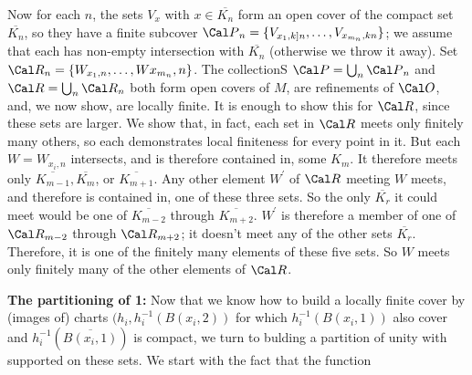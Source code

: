 Now for each $n$, the sets $V_x$ with $x\in \overline{K_n}$ form an open cover of the compact set $\overline{K_n}$,
so they have a finite subcover ${\Cal P}_n=\{V_{x_1,k]n},\ldots ,V_{x_{m_n},kn}\}$; we assume that each
has non-empty intersection with $\overline{K_n}$ (otherwise we throw it away). 
Set ${\Cal R}_n=\{W_{x_1,n},\ldots ,W{x_{m_n},n}\}$. The collectionS
$\Cal P=\bigcup_n{\Cal P}_n$  and ${\Cal R}=\bigcup_n{\Cal R}_n$ both form open covers of $M$, are
refinements of $\Cal O$, and, we now show, are locally finite. It is enough to show this for $\Cal R$,
since these sets are larger. We show that, in fact, each set in $\Cal R$ meets only
finitely many others, so each demonstrates local finiteness for every point in it.
But each $W=W_{x_i,n}$ intersects, and is therefore contained in, some $K_m$. 
It therefore meets only $\overline{K_{m-1}}, \overline{K_m}$, or $\overline{K_{m+1}}$. 
Any other element $W^\prime$ of $\Cal R$ meeting $W$ meets, and therefore is contained in, one of these three
sets. So the only $\overline{K_r}$ it could meet would be one of $\overline{K_{m-2}}$
through $\overline{K_{m+2}}$. $W^\prime$ is therefore a member of one of ${\Cal R}_{m-2}$ through
${\Cal R}_{m+2}$; it doesn't meet any of the other sets $\overline{K_r}$. Therefore, it is
one of the finitely many elements of these five sets. So $W$ meets only finitely many of the other
elements of $\Cal R$. 

\msk

{\bf The partitioning of 1:} Now that we know how to build a locally finite cover by (images of) charts $(h_i,h_i^{-1}(B(x_i,2))$
for which $h_i^{-1}(B(x_i,1))$ also cover and $h_i^{-1}(\overline{B(x_i,1)})$ is compact, we turn 
to bulding a partition of unity with supported on these sets. We start with the fact
that the function


